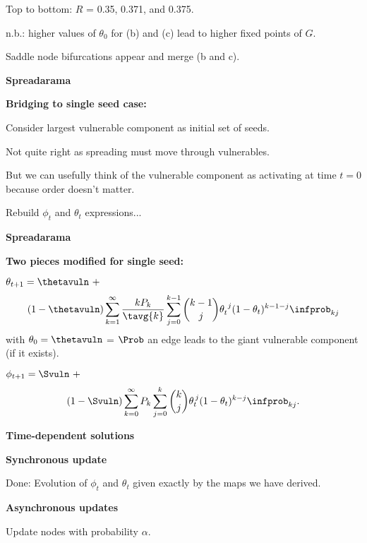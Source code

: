 \begin{frame}[plain]
      Top to bottom: $R$ = 0.35, 0.371, and 0.375.
     
      n.b.: higher values of $\theta_0$ for (b) and (c)
      lead to higher fixed points of $G$.
     
      Saddle node bifurcations 
      appear and merge (b and c).
    
  

  \textbf{Spreadarama}

  \textbf{Bridging to single seed case:}
    
     
      Consider largest vulnerable component
      as initial set of seeds.
    
      Not quite right as spreading must move
      through vulnerables.
    
      But we can usefully think of the vulnerable
      component as activating at time $t=0$
      because order doesn't matter.
    
      Rebuild $\phi_t$ and $\theta_t$ expressions...
    
  


  \textbf{Spreadarama}

  \textbf{Two pieces modified for single seed:}
    
    
      $
      \theta_{t+1}
      =
      \thetavuln 
      \ +
      $
      $$
      (1-\thetavuln)
      \sum_{k=1}^{\infty}
      \frac{k P_k}{\tavg{k}}
      \sum_{j=0}^{k-1}
      \binom{k-1}{j}
      \theta_{t}^{\ j}
      (1-\theta_{t})^{k-1-j}
      \infprob_{kj}
      $$
      with $\theta_0 = \thetavuln$ = $\Prob$ an edge leads
      to the giant vulnerable component (if it exists).
    
      $ 
      \phi_{t+1}
      = 
      \Svuln
      \ + 
      $
      $$
      (1-\Svuln)
      \sum_{k=0}^{\infty}
      P_k
      \sum_{j=0}^{k}
      \binom{k}{j}
      \theta_t^{\, j}
      (1-\theta_t)^{k-j} 
      \infprob_{kj}.
      $$
    
  



  \textbf{Time-dependent solutions}

  \textbf{Synchronous update}
    
     Done: Evolution of $\phi_t$ and $\theta_t$
      given exactly by the maps we have
      derived.
    
  

  \textbf{Asynchronous updates}
    
     
      Update nodes with probability $\alpha$.
     

\end{frame}
